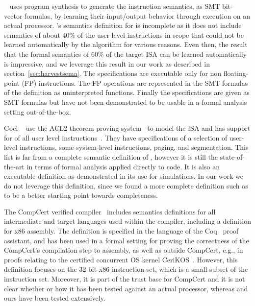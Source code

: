 \Strata~\cite{Heule2016a} uses program synthesis to generate the instruction
semantics, as SMT bit-vector formulas, by learning their input/output behavior
through execution on an actual processor. \Strata's semantics definition for
\ISA is incomplete as it does not include semantics of about 40\% of the
user-level instructions in scope that
could not be learned automatically by the algorithm for various reasons. Even then,
the result that the formal semantics of 60\% of the target \ISA ISA can be learned automatically
is impressive, and we leverage this result in our work as described in
section~\ref{sec:harvestsema}.
The specifications are executable only for non floating-point (FP) instructions.
The FP operations are represented in the SMT formulas of the definition as
uninterpreted functions. Finally the specifications are given as SMT formulas
but have not been demonstrated to be usable in a formal analysis setting out-of-the-box.

Goel \etal~\cite{Goel:FMCAD14} use the ACL2 theorem-proving
system~\cite{ACL2:Kaufmann2000} to model the \ISA ISA and has support for
\goelPerc{} of all user level instructions~\cite{GoelList}. They have specifications of a selection
of user-level instructions, some system-level instructions, paging, and
segmentation. This list is far from a complete semantic definition of \ISA,
however it is still the state-of-the-art in terms of formal analysis applied
directly to \ISA code. It is also an executable definition as demonstrated in
its use for simulations. In our work we do not leverage this definition, since
we found a more complete definition such as \Strata to be a better starting
point towards completeness.

The CompCert verified compiler~\cite{Leroy:2009} includes semantics
definitions for all intermediate and target languages used within the compiler,
including a definition for x86 assembly. The definition is specified in
the language of the Coq~\cite{Coq} proof assistant, and has been used in a formal
setting for proving the correctness of the CompCert's compilation step to assembly,
as well as outside CompCert, e.g., in proofs relating to the certified concurrent
OS kernel CeriKOS~\cite{Gu:2016}. However, this definition focuses on the
32-bit x86 instruction set, which is a small subset of the \ISA instruction 
set.
Moreover, it is part of the trust base for CompCert and it is not clear
whether or how it has been tested against an actual processor, whereas
\Strata and ours have been tested extensively.

